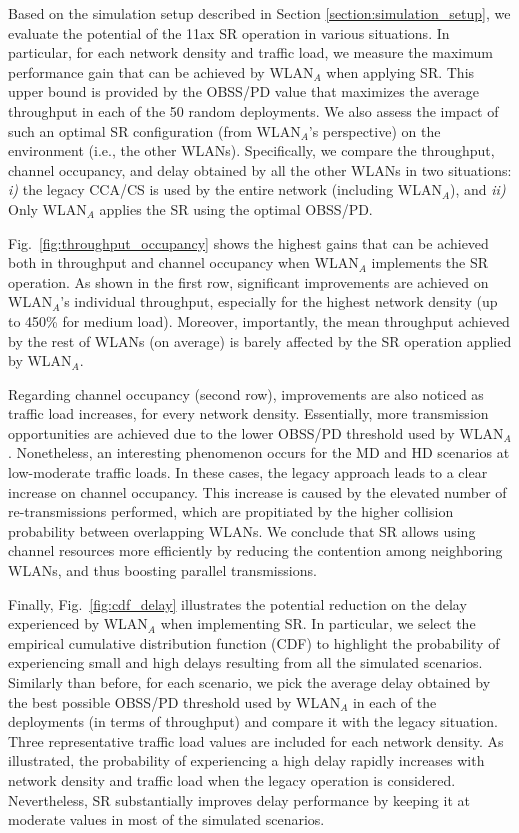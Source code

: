 \documentclass[conference]{IEEEtran}
\begin{document}
	Based on the simulation setup described in Section \ref{section:simulation_setup}, we evaluate the potential of the 11ax SR operation in various situations. In particular, for each network density and traffic load, we measure the maximum performance gain that can be achieved by WLAN$_A$ when applying SR. This upper bound is provided by the OBSS/PD value that maximizes the average throughput in each of the 50 random deployments. We also assess the impact of such an optimal SR configuration (from WLAN$_A$'s perspective) on the environment (i.e., the other WLANs). Specifically, we compare the throughput, channel occupancy, and delay obtained by all the other WLANs in two situations: \emph{i)} the legacy CCA/CS is used by the entire network (including WLAN$_A$), and \emph{ii)} Only WLAN$_A$ applies the SR using the optimal OBSS/PD.
	
	Fig.~\ref{fig:throughput_occupancy} shows the highest gains that can be achieved both in throughput and channel occupancy when WLAN$_A$ implements the SR operation. As shown in the first row, significant improvements are achieved on WLAN$_A$'s individual throughput, especially for the highest network density (up to 450\% for medium load). Moreover, importantly, the mean throughput achieved by the rest of WLANs (on average) is barely affected by the SR operation applied by WLAN$_A$.
	
	Regarding channel occupancy (second row), improvements are also noticed as traffic load increases, for every network density. Essentially, more transmission opportunities are achieved due to the lower OBSS/PD threshold used by WLAN$_A$. Nonetheless, an interesting phenomenon occurs for the MD and HD scenarios at low-moderate traffic loads. In these cases, the legacy approach leads to a clear increase on channel occupancy. This increase is caused by the elevated number of re-transmissions performed, which are propitiated by the higher collision probability between overlapping WLANs. We conclude that SR allows using channel resources more efficiently by reducing the contention among neighboring WLANs, and thus boosting parallel transmissions.
	
	Finally, Fig.~\ref{fig:cdf_delay} illustrates the potential reduction on the delay experienced by WLAN$_A$ when implementing SR. In particular, we select the empirical cumulative distribution function (CDF) to highlight the probability of experiencing small and high delays resulting from all the simulated scenarios. Similarly than before, for each scenario, we pick the average delay obtained by the best possible OBSS/PD threshold used by WLAN$_A$ in each of the deployments (in terms of throughput) and compare it with the legacy situation. Three representative traffic load values are included for each network density. As illustrated, the probability of experiencing a high delay rapidly increases with network density and traffic load when the legacy operation is considered. Nevertheless, SR substantially improves delay performance by keeping it at moderate values in most of the simulated scenarios.
\end{document}

